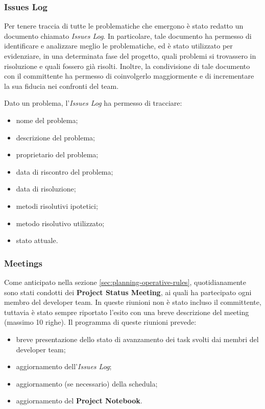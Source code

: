 \subsubsection{Issues Log}
Per tenere traccia di tutte le problematiche che emergono è stato redatto un documento chiamato \textit{Issues Log}. In particolare, tale documento ha permesso di identificare e analizzare meglio le problematiche, ed è stato utilizzato per evidenziare, in una determinata fase del progetto, quali problemi si trovassero in risoluzione e quali fossero già risolti. Inoltre, la condivisione di tale documento con il committente ha permesso di coinvolgerlo maggiormente e di incrementare la sua fiducia nei confronti del team.

Dato un problema, l'\textit{Issues Log} ha permesso di tracciare:
\begin{itemize}
    \item nome del problema;
    \item descrizione del problema;
    \item proprietario del problema;
    \item data di riscontro del problema;
    \item data di risoluzione;
    \item metodi risolutivi ipotetici;
    \item metodo risolutivo utilizzato;
    \item stato attuale.
\end{itemize}

\subsubsection{Meetings}
Come anticipato nella sezione \ref{sec:planning-operative-rules}, quotidianamente sono stati condotti dei \textbf{Project Status Meeting}, ai quali ha partecipato ogni membro del developer team. In queste riunioni non è stato incluso il committente, tuttavia è stato sempre riportato l'esito con una breve descrizione del meeting (massimo 10 righe). Il programma di queste riunioni prevede:
\begin{itemize}
    \item breve presentazione dello stato di avanzamento dei task svolti dai membri del developer team;
    \item aggiornamento dell'\textit{Issues Log};
    \item aggiornamento (se necessario) della schedula;
    \item aggiornamento del \textbf{Project Notebook}.
\end{itemize}

